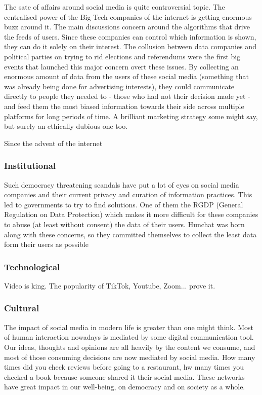 \documentclass[12pt]{article}
\begin{document}
	The sate of affairs around social media is quite controversial topic. The centralised power of the Big Tech companies of the internet is getting enormous buzz around it. The main discussions concern around the algorithms that drive the feeds of users. Since these companies can control which information is shown, they can do it solely on their interest. The collusion between data companies and political parties on trying to rid elections and referendums were the first big events that launched this major concern overt these issues. By collecting an enormous amount of data from the users of these social media (something that was already being done for advertising interests), they could communicate directly to people they needed to - those who had not their decision made yet - and feed them the most biased information towards their side across multiple platforms for long periods of time. A brilliant marketing strategy some might say, but surely an ethically dubious one too.
	
	Since the advent of the internet
		
	\subsubsection{Institutional}
	Such democracy threatening scandals have put a lot of eyes on social media companies and their current privacy and curation of information practices. This led to governments to try to find solutions. One of them the RGDP (General Regulation on Data Protection) which makes it more difficult for these companies to abuse (at least without consent) the data of their users. Hunchat was born along with these concerns, so they committed themselves to collect the least data form their users as possible
	
	\subsubsection{Technological}
	Video is king. The popularity of TikTok, Youtube, Zoom... prove it.
	
	\subsubsection{Cultural}
	The impact of social media in modern life is greater than one might think. Most of human interaction nowadays is mediated by some digital communication tool. Our ideas, thoughts and opinions are all heavily by the content we consume, and most of those consuming decisions are now mediated by social media. How many times did you check reviews before going to a restaurant, hw many times you checked a book because someone shared it their social media. These networks have great impact in our well-being, on democracy and on society as a whole.
	
\end{document}

